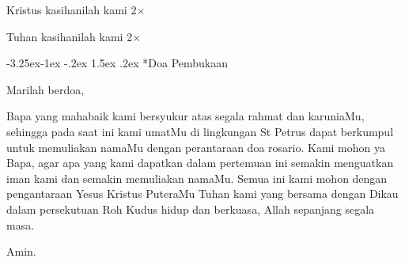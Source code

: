 \documentclass[a5paper,titlepage,12pt]{scrbook}
\makeatletter
\renewcommand\subsection{\@startsection{subsection}{2}{\z@}%
                                     {-3.25ex\@plus -1ex \@minus -.2ex}%
                                     {1.5ex \@plus .2ex}%
                                     {\normalfont\normalsize\bfseries}}
\makeatother
\begin{document}
Kristus kasihanilah kami 2$\times$

Tuhan kasihanilah kami 2$\times$


\subsection*{Doa Pembukaan}

Marilah berdoa,

Bapa yang mahabaik kami bersyukur atas segala rahmat dan karuniaMu, sehingga pada saat ini kami umatMu di lingkungan St Petrus dapat berkumpul untuk memuliakan namaMu dengan perantaraan doa rosario. Kami mohon ya Bapa, agar apa yang kami dapatkan dalam pertemuan ini semakin menguatkan iman kami dan semakin memuliakan namaMu. Semua ini kami mohon
dengan pengantaraan Yesus Kristus PuteraMu Tuhan kami yang bersama dengan Dikau dalam persekutuan Roh Kudus hidup dan berkuasa, Allah sepanjang segala masa.

Amin.
\end{document}

